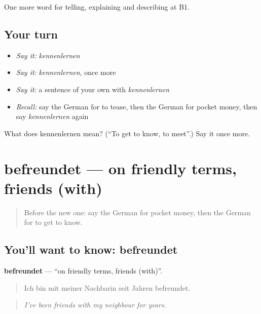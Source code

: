 \begin{grammarlens}[title={What you've built}]
One more word for telling, explaining and describing at B1.
\end{grammarlens}

\subsection*{Your turn}
\begin{itemize}
\raggedright
  \item \emph{Say it:} \emph{kennenlernen}
  \item \emph{Say it:} \emph{kennenlernen}, once more
  \item \emph{Say it:} a sentence of your own with \emph{kennenlernen}
  \item \emph{Recall:} say the German for to tease, then the German for pocket money, then say \emph{kennenlernen} again
\end{itemize}

\begin{tcolorbox}[breakable,colback=teal!4,colframe=teal!35!black,title={Before you move on}]
What does kennenlernen mean? (\textquotedblleft{}To get to know, to meet\textquotedblright{}.) Say it once more.
\end{tcolorbox}
\section[befreundet]{befreundet — on friendly terms, friends (with)}

\label{lesson:GE-C498-befreundet}



\begin{quote}
Before the new one: say the German for pocket money, then the German for to get to know.
\end{quote}

\subsection*{You'll want to know: befreundet}
\textbf{befreundet} — \textquotedblleft{}on friendly terms, friends (with)\textquotedblright{}.

\begin{quote}
Ich bin mit meiner Nachbarin seit Jahren befreundet.
\end{quote}

\begin{quote}
\emph{I've been friends with my neighbour for years.}
\end{quote}


